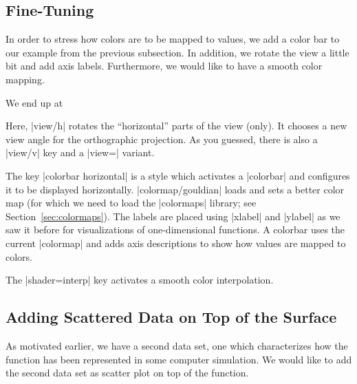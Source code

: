 \subsection{Fine-Tuning}

In order to stress how colors are to be mapped to values, we add a color bar to
our example from the previous subsection. In addition, we rotate the view a
little bit and add axis labels. Furthermore, we would like to have a smooth
color mapping.

We end up at
%
\pgfplotsexpensiveexample
\begin{codeexample}[]
\end{codeexample}
%
Here, |view/h| rotates the ``horizontal'' parts of the view (only). It chooses
a new view angle for the orthographic projection. As you guessed, there is also
a |view/v| key and a |view=| variant.

The key |colorbar horizontal| is a style which activates a |colorbar| and
configures it to be displayed horizontally. |colormap/gouldian| loads and sets
a better color map (for which we need to load the |colormaps| library; see
Section~\ref{sec:colormaps}). The labels are placed using |xlabel| and |ylabel|
as we saw it before for visualizations of one-dimensional functions. A colorbar
uses the current |colormap| and adds axis descriptions to show how values are
mapped to colors.

The |shader=interp| key activates a smooth color interpolation.


\subsection{Adding Scattered Data on Top of the Surface}

As motivated earlier, we have a second data set, one which characterizes how
the function has been represented in some computer simulation. We would like to
add the second data set as scatter plot on top of the function.

